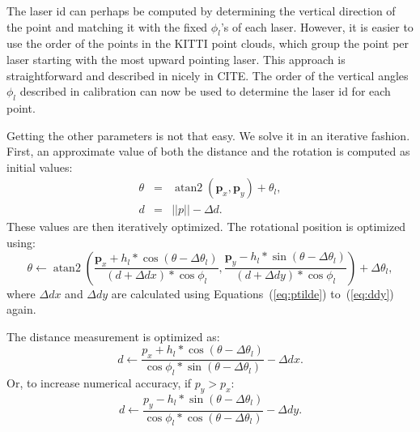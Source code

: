 \documentclass[english]{article}
\DeclareMathOperator*{\atantwo}{atan2}
\begin{document}
The laser id can perhaps be computed by determining the vertical
direction of the point and matching it with the fixed $\phi_l$'s of each
laser. However, it is easier to use the order of the points in the KITTI
point clouds, which group the point per laser starting with the most
upward pointing laser. This approach is straightforward and described in nicely
in CITE. The order of the vertical angles $\phi_l$ described in calibration
can now be used to determine the laser id for each point.

Getting the other parameters is not that easy. We solve it in
an iterative fashion. First, an approximate value of both the distance and
the rotation is computed as initial values:
\begin{eqnarray}
  \theta &=& \atantwo(\mathbf{p}_x, \mathbf{p}_y) + \theta_l, \\
  d &=& ||p|| - \Delta d.
\end{eqnarray}
These values are then iteratively optimized. The rotational position is optimized using:
\begin{equation}
   \theta \leftarrow \atantwo\left(
                     \frac{\mathbf{p}_x + h_l * \cos(\theta - \Delta \theta_l)}{(d + \Delta dx) * \cos{\phi_l}},
                     \frac{\mathbf{p}_y - h_l * \sin(\theta - \Delta \theta_l)}{(d + \Delta dy) * \cos{\phi_l}}
           \right) + \Delta \theta_l,
   \label{eq:thetait}
\end{equation}
where $\Delta dx$ and $\Delta dy$ are calculated using
Equations~(\ref{eq:ptilde}) to~(\ref{eq:ddy}) again.

The distance measurement is optimized as:
\begin{equation}
    d \leftarrow \frac{p_x + h_l * \cos(\theta - \Delta \theta_l)}{\cos{\phi_l} * \sin(\theta - \Delta \theta_l)} - \Delta dx.  \label{eq:dita}
\end{equation}
Or, to increase numerical accuracy, if $p_y > p_x$:
\begin{equation}
    d \leftarrow \frac{p_y - h_l * \sin(\theta - \Delta \theta_l)}{\cos{\phi_l} * \cos(\theta - \Delta \theta_l)} - \Delta dy.  \label{eq:ditb}
\end{equation}

\end{document}
